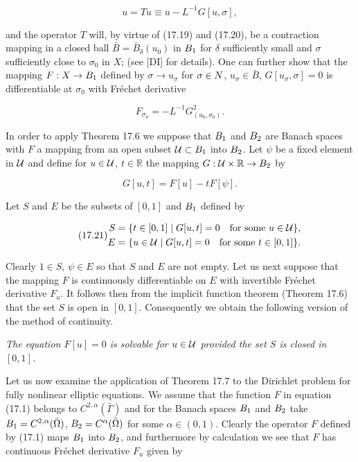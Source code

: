 \[
u=Tu\equiv u-L^{-1}G[u,\sigma],
\]

and the operator $T$ will, by virtue of (17.19) and (17.20), be a contraction mapping
in a closed ball $\bar{B}=\bar{B}_{\delta}(u_{0})$ in $B_{1}$ for $\delta$ sufficiently small and $\sigma$ sufficiently close to $\sigma_{0}$
in $X$; (see [DI] for details). One can further show that the mapping $F : X \to B_{1}$
defined by $\sigma\to u_{\sigma}$ for $\sigma\in N$, $u_{\sigma}\in\bar{B}$, $G[u_{\sigma},\sigma]=0$ is differentiable at $\sigma_{0}$ with Fréchet
derivative

\[
F_{\sigma_{0}}=-L^{-1}G^{2}_{(u_{0},\sigma_{0})}.
\]

In order to apply Theorem 17.6 we suppose that $B_{1}$ and $B_{2}$ are Banach spaces
with $F$ a mapping from an open subset $\mathcal{U} \subset B_{1}$ into $B_{2}$. Let $\psi$ be a fixed element in
$\mathcal{U}$ and define for $u\in\mathcal{U}$, $t\in\mathbb{R}$ the mapping $G : \mathcal{U} \times \mathbb{R} \to B_{2}$ by

\[
G[u,t]=F[u]-tF[\psi].
\]

Let $S$ and $E$ be the subsets of $[0,1]$ and $B_{1}$ defined by

\begin{equation}
\tag{17.21}
\begin{aligned}
S &= \{t\in[0,1]\mid G[u,t]=0 \quad \text{for some }u\in\mathcal{U}\},\\
E &= \{u\in\mathcal{U}\mid G[u,t]=0 \quad \text{for some }t\in[0,1]\}.
\end{aligned}
\end{equation}

Clearly $1\in S$, $\psi\in E$ so that $S$ and $E$ are not empty. Let us next suppose that the
mapping $F$ is continuously differentiable on $E$ with invertible Fréchet derivative $F_{u}$.
It follows then from the implicit function theorem (Theorem 17.6) that the set $S$ is
open in $[0,1]$. Consequently we obtain the following version of the method of
continuity.

\begin{theorem}[Theorem 17.7]\label{gt-ch17-thm-17-7}
\textit{The equation $F[u]=0$ is solvable for $u\in\mathcal{U}$ provided the set $S$ is
closed in $[0,1]$.}
\end{theorem}

Let us now examine the application of Theorem 17.7 to the Dirichlet problem for
fully nonlinear elliptic equations. We assume that the function $F$ in equation (17.1)
belongs to $C^{2,\alpha}(\bar{\Gamma})$ and for the Banach spaces $B_{1}$ and $B_{2}$ take $B_{1}=C^{2,\alpha}(\bar{\Omega})$,
$B_{2}=C^{\alpha}(\bar{\Omega})$ for some $\alpha\in(0,1)$. Clearly the operator $F$ defined by (17.1) maps $B_{1}$
into $B_{2}$, and furthermore by calculation we see that $F$ has continuous Fréchet
derivative $F_{u}$ given by

